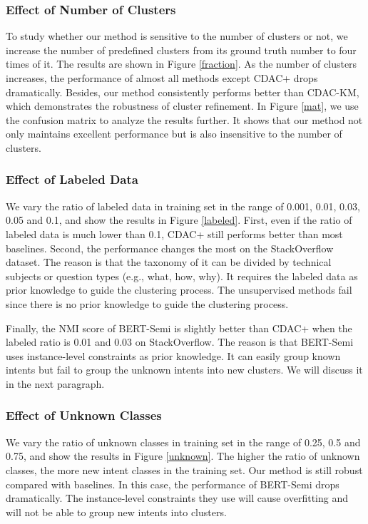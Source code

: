 \documentclass[letterpaper]{article} \usepackage{aaai20}  \usepackage{times}  \usepackage{helvet} \usepackage{courier}  \usepackage[hyphens]{url}  \usepackage{graphicx} \urlstyle{rm} \def\UrlFont{\rm}  \usepackage{graphicx}  \frenchspacing  \setlength{\pdfpagewidth}{8.5in}  \setlength{\pdfpageheight}{11in}
\begin{document}
\subsubsection{Effect of Number of Clusters}
To study whether our method is sensitive to the number of clusters or not, we increase the number of predefined clusters from its ground truth number to four times of it. The results are shown in Figure \ref{fraction}. As the number of clusters increases, the performance of almost all methods except CDAC+ drops dramatically. Besides, our method consistently performs better than CDAC-KM, which demonstrates the robustness of cluster refinement. In Figure \ref{mat}, we use the confusion matrix to analyze the results further. It shows that our method not only maintains excellent performance but is also insensitive to the number of clusters. 

\subsubsection{Effect of Labeled Data}
We vary the ratio of labeled data in training set in the range of 0.001, 0.01, 0.03, 0.05 and 0.1, and show the results in Figure \ref{labeled}. First, even if the ratio of labeled data is much lower than 0.1, CDAC+ still performs better than most baselines. Second, the performance changes the most on the StackOverflow dataset. The reason is that the taxonomy of it can be divided by technical subjects or question types (e.g., what, how, why). It requires the labeled data as prior knowledge to guide the clustering process. The unsupervised methods fail since there is no prior knowledge to guide the clustering process. 

Finally, the NMI score of BERT-Semi is slightly better than CDAC+ when the labeled ratio is 0.01 and 0.03 on StackOverflow. The reason is that BERT-Semi uses instance-level constraints as prior knowledge. It can easily group known intents but fail to group the unknown intents into new clusters. We will discuss it in the next paragraph.

\subsubsection{Effect of Unknown Classes}
We vary the ratio of unknown classes in training set in the range of 0.25, 0.5 and 0.75, and show the results in Figure \ref{unknown}. The higher the ratio of unknown classes, the more new intent classes in the training set. Our method is still robust compared with baselines. In this case, the performance of BERT-Semi drops dramatically. The instance-level constraints they use will cause overfitting and will not be able to group new intents into clusters.
\end{document}
